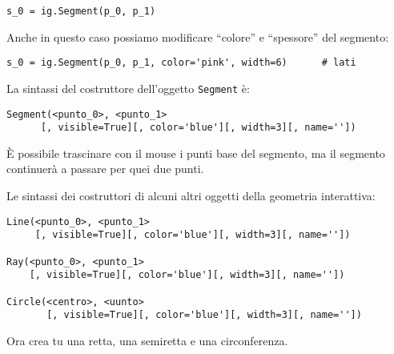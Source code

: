 \begin{lstlisting}
s_0 = ig.Segment(p_0, p_1)
\end{lstlisting}

Anche in questo caso possiamo modificare ``colore'' e ``spessore'' del 
segmento:

\begin{lstlisting}
s_0 = ig.Segment(p_0, p_1, color='pink', width=6)      # lati
\end{lstlisting}

La sintassi del costruttore dell'oggetto \texttt{Segment} è:

\begin{lstlisting}
Segment(<punto_0>, <punto_1>
      [, visible=True][, color='blue'][, width=3][, name=''])
\end{lstlisting}

È possibile trascinare con il mouse i punti base del segmento, ma il segmento
continuerà a passare per quei due punti.

Le sintassi dei costruttori di alcuni altri oggetti della geometria interattiva:

\begin{lstlisting}
Line(<punto_0>, <punto_1>
     [, visible=True][, color='blue'][, width=3][, name=''])
    
Ray(<punto_0>, <punto_1>
    [, visible=True][, color='blue'][, width=3][, name=''])

Circle(<centro>, <uunto>
       [, visible=True][, color='blue'][, width=3][, name=''])
\end{lstlisting}

Ora crea tu una retta, una semiretta e una circonferenza.

